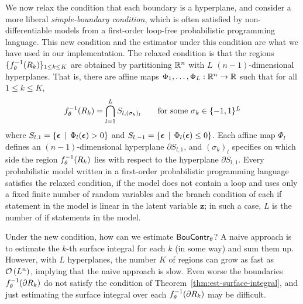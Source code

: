 We now relax the condition that each boundary is a hyperplane, and consider a more liberal \emph{simple-boundary condition}, which is often satisfied by non-differentiable models from a first-order loop-free probabilistic programming language. This new condition and the estimator under this condition are 
what we have used in our implementation. The relaxed condition is that
the regions $\{f_\theta^{-1}(R_k)\}_{1 \leq k \leq K}$ are obtained
by partitioning $\mathbb{R}^n$ with $L$ $(n{-}1)$-dimensional hyperplanes. That is, there are 
affine maps $\Phi_1,\ldots,\Phi_L : \mathbb{R}^n \to \mathbb{R}$ such that for all $1 \leq k \leq K$,
\[
	f_\theta^{-1}(R_k) = \bigcap_{l=1}^L S_{l, (\sigma_k)_l}
\qquad \mbox{for some $\sigma_k \in \{-1,1\}^L$}
\]
where
$S_{l,1} = \{\bm{\epsilon} \,\mid\, \Phi_l (\bm{\epsilon}) > 0 \}$ and
$S_{l,-1} = \{\bm{\epsilon} \,\mid\, \Phi_l (\bm{\epsilon}) \leq 0 \}$.
Each affine map $\Phi_l$ defines an $(n{-}1)$-dimensional hyperplane $\partial S_{l,1}$,
and $(\sigma_k)_l$ specifies on which side the region $f_\theta^{-1}(R_k)$ lies
with respect to the hyperplane $\partial S_{l,1}$.
Every probabilistic model written in a first-order probabilistic programming language
satisfies the relaxed condition,
if the model does not contain a loop and uses only a fixed finite number of random
variables and the branch condition of each if statement in the model
is linear in the latent variable $\bm{z}$;
in such a case, $L$ is the number of if statements in the model.

Under the new condition, how can we estimate $\mathsf{BouContr}_\theta$?
A naive approach %
is to estimate the $k$-th surface integral for each $k$ (in some way) and sum them up.
However, with $L$ hyperplanes, the number $K$ of regions can grow as fast as $\mathcal{O}\left({L^n}\right)$,
implying that the naive approach is slow. Even worse the boundaries 
$f_\theta^{-1}(\partial R_k)$ do not satisfy the condition of Theorem~\ref{thm:est-surface-integral},
and just estimating the surface integral over each $f_\theta^{-1}(\partial R_k)$ 
may be difficult.

